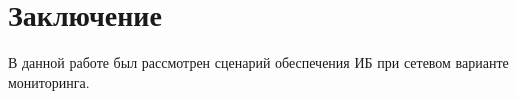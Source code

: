 \section*{Заключение}

В данной работе был рассмотрен сценарий обеспечения ИБ при сетевом варианте мониторинга.
